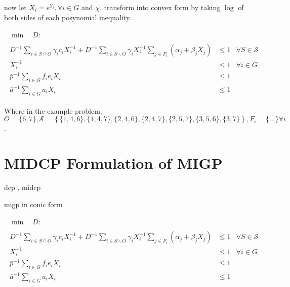 \documentclass[]{article}
\begin{document}
now let $X_i = e^{Y_i}, \forall i \in G$ and $\chi$. transform into convex form by taking $\log$ of both sides of each posynomial inequality.

\begin{subequations}
\begin{gather}
\begin{align}
\min \quad D :
\end{align}
\\
\begin{align}
D^{-1} \sum_{i \in S \cap O} \gamma_i c_i X_i^{-1} + D^{-1} \sum_{i \in S \backslash O} \gamma_i X_i^{-1} \sum_{j \in F_i} \left( \alpha_j + \beta_j X_j \right)
& \leq 1
& \forall S \in \mathcal{S}
\\
X_i^{-1}
& \leq 1
& \forall i \in G
\\
\bar{p}^{-1} \sum_{i \in G} f_i e_i X_i 
& \leq 1
\\
\bar{a}^{-1} \sum_{i \in G} a_i X_i 
& \leq 1
\end{align}
\end{gather}
\end{subequations}





Where in the example problem, $O = \{6,7\}, \mathcal{S} = \left\{ \{1,4,6\}, \{1,4,7\}, \{2,4,6\}, \{2,4,7\}, \{2,5,7\}, \{3,5,6\}, \{3,7\} \right\}, F_i = \{...\} \forall i$.





\section{MIDCP Formulation of MIGP}

dcp \cite{boyd06}, midcp \cite{lubin15}

migp in conic form

\begin{subequations}
\begin{gather}
\begin{align}
\min \quad D :
\end{align}
\\
\begin{align}
D^{-1} \sum_{i \in S \cap O} \gamma_i c_i X_i^{-1} + D^{-1} \sum_{i \in S \backslash O} \gamma_i X_i^{-1} \sum_{j \in F_i} \left( \alpha_j + \beta_j X_j \right)
& \leq 1
& \forall S \in \mathcal{S}
\\
X_i^{-1}
& \leq 1
& \forall i \in G
\\
\bar{p}^{-1} \sum_{i \in G} f_i e_i X_i 
& \leq 1
\\
\bar{a}^{-1} \sum_{i \in G} a_i X_i 
& \leq 1
\end{align}
\end{gather}
\end{subequations}
\end{document}
